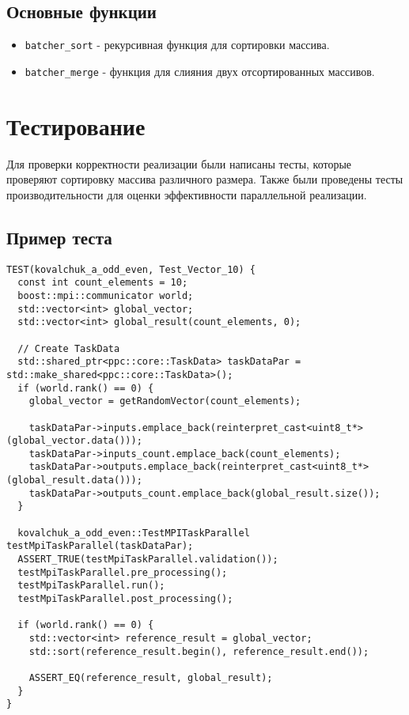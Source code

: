 \documentclass[12pt]{article}
\begin{document}
\subsection{Основные функции}
\begin{itemize}
    \item \texttt{batcher\_sort} - рекурсивная функция для сортировки массива.
    \item \texttt{batcher\_merge} - функция для слияния двух отсортированных массивов.
\end{itemize}

\section{Тестирование}
Для проверки корректности реализации были написаны тесты, которые проверяют сортировку массива различного размера. Также были проведены тесты производительности для оценки эффективности параллельной реализации.

\subsection{Пример теста}
\begin{lstlisting}
TEST(kovalchuk_a_odd_even, Test_Vector_10) {
  const int count_elements = 10;
  boost::mpi::communicator world;
  std::vector<int> global_vector;
  std::vector<int> global_result(count_elements, 0);

  // Create TaskData
  std::shared_ptr<ppc::core::TaskData> taskDataPar = std::make_shared<ppc::core::TaskData>();
  if (world.rank() == 0) {
    global_vector = getRandomVector(count_elements);

    taskDataPar->inputs.emplace_back(reinterpret_cast<uint8_t*>(global_vector.data()));
    taskDataPar->inputs_count.emplace_back(count_elements);
    taskDataPar->outputs.emplace_back(reinterpret_cast<uint8_t*>(global_result.data()));
    taskDataPar->outputs_count.emplace_back(global_result.size());
  }

  kovalchuk_a_odd_even::TestMPITaskParallel testMpiTaskParallel(taskDataPar);
  ASSERT_TRUE(testMpiTaskParallel.validation());
  testMpiTaskParallel.pre_processing();
  testMpiTaskParallel.run();
  testMpiTaskParallel.post_processing();

  if (world.rank() == 0) {
    std::vector<int> reference_result = global_vector;
    std::sort(reference_result.begin(), reference_result.end());

    ASSERT_EQ(reference_result, global_result);
  }
}
\end{lstlisting}
\end{document}
